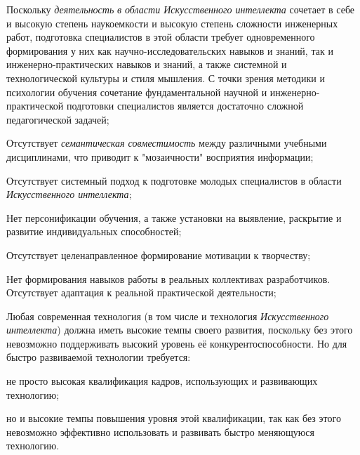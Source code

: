 \begin{textitemize}
	\item
	Поскольку \textit{деятельность} \textit{в области Искусственного интеллекта} сочетает в себе и высокую степень наукоемкости и высокую степень сложности инженерных работ, подготовка специалистов в этой области требует одновременного формирования у них как научно-исследовательских навыков и знаний, так и инженерно-практических навыков и знаний, а также системной и технологической культуры и стиля мышления. С точки зрения методики и психологии обучения сочетание фундаментальной научной и инженерно-практической подготовки специалистов является достаточно сложной педагогической задачей;
	\item
	Отсутствует \textit{семантическая совместимость} между различными учебными дисциплинами, что приводит к "мозаичности"{} восприятия информации;
	\item
	Отсутствует системный подход к подготовке молодых специалистов в области \textit{Искусственного интеллекта};
	\item
	Нет персонификации обучения, а также установки на выявление, раскрытие и развитие индивидуальных способностей;
	\item
	Отсутствует целенаправленное формирование мотивации к творчеству;
	\item
	Нет формирования навыков работы в реальных коллективах разработчиков. Отсутствует адаптация к реальной практической деятельности;
	\item
	Любая современная технология (в том числе и технология \textit{Искусственного интеллекта}) должна иметь высокие темпы своего развития, поскольку без этого невозможно поддерживать высокий уровень её конкурентоспособности. Но для быстро развиваемой технологии требуется:
	\begin{textitemize}
		\item
		не просто высокая квалификация кадров, использующих и развивающих технологию;
		\item
		но и высокие темпы повышения уровня этой квалификации, так как без этого невозможно эффективно использовать и развивать быстро меняющуюся технологию.
	\end{textitemize}
\end{textitemize}

